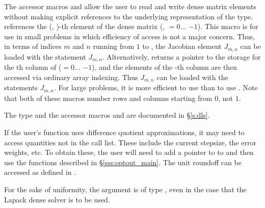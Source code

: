 {{  The accessor macros  and  allow the user to
  read and write dense matrix elements without making explicit
  references to the underlying representation of the 
  type.  references the (, )-th
  element of the dense matrix  (, $= 0\ldots$ $-1$).
  This macro is for use in small problems in which efficiency of access is not a
  major concern.  Thus, in terms of indices $m$ and $n$ running from $1$ to
  , the Jacobian element $J_{m,n}$ can be loaded with the statement
   $J_{m,n}$.  Alternatively,
   returns a pointer to the storage for
  the th column of  ($= 0\ldots$ $-1$), and the 
  elements of the -th column
  are then accessed via ordinary array indexing.  Thus $J_{m,n}$ can be 
  loaded with the statements 
   $J_{m,n}$.  For large problems, it is more 
  efficient to use  than to use . 
  Note that both of these macros number rows and columns
  starting from $0$, not $1$.  

  The  type and the accessor macros  and 
   are documented in \S\ref{s:dls}.

  If the user's  function uses difference
  quotient approximations, it may need to access quantities not in the
  call list. These include the current stepsize, the error weights, etc.
  To obtain these, the user will need to add a pointer to  
  to  and then use the  functions described in
  \S\ref{sss:optout_main}. The unit roundoff can be accessed as
   defined in .

  For the sake of uniformity, the argument  is of type ,
  even in the case that the Lapack dense solver is to be used.
}
}

